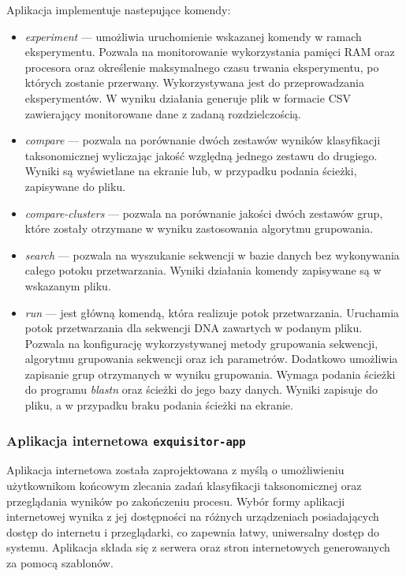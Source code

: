             Aplikacja implementuje nastepujące komendy:
            \begin{itemize}
                \item {
                    \textit{experiment} --- umożliwia uruchomienie wskazanej komendy w ramach eksperymentu. Pozwala na monitorowanie wykorzystania pamięci RAM oraz procesora oraz określenie maksymalnego czasu trwania eksperymentu, po których zostanie przerwany. Wykorzystywana jest do przeprowadzania eksperymentów. W wyniku działania generuje plik w formacie CSV zawierający monitorowane dane z zadaną rozdzielczością.
                }
                \item {
                    \textit{compare} --- pozwala na porównanie dwóch zestawów wyników klasyfikacji taksonomicznej wyliczając jakość względną jednego zestawu do drugiego. Wyniki są wyświetlane na ekranie lub, w przypadku podania ścieżki, zapisywane do pliku.
                }
                \item {
                    \textit{compare-clusters} --- pozwala na porównanie jakości dwóch zestawów grup, które zostały otrzymane w wyniku zastosowania algorytmu grupowania.
                }
                \item {
                    \textit{search} --- pozwala na wyszukanie sekwencji w bazie danych bez wykonywania całego potoku przetwarzania. Wyniki działania komendy zapisywane są w wskazanym pliku.
                }
                \item {
                    \textit{run} --- jest główną komendą, która realizuje potok przetwarzania. Uruchamia potok przetwarzania dla sekwencji DNA zawartych w podanym pliku. Pozwala na konfigurację wykorzystywanej metody grupowania sekwencji, algorytmu grupowania sekwencji oraz ich parametrów. Dodatkowo umożliwia zapisanie grup otrzymanych w wyniku grupowania. Wymaga podania ścieżki do programu \textit{blastn} oraz ścieżki do jego bazy danych. Wyniki zapisuje do pliku, a w przypadku braku podania ścieżki na ekranie.
                }
            \end{itemize}

        \subsubsection{Aplikacja internetowa \texttt{exquisitor-app}}
            Aplikacja internetowa została zaprojektowana z myślą o umożliwieniu użytkownikom końcowym zlecania zadań klasyfikacji taksonomicznej oraz przeglądania wyników po zakończeniu procesu. Wybór formy aplikacji internetowej wynika z jej dostępności na różnych urządzeniach posiadających dostęp do internetu i przeglądarki, co zapewnia łatwy, uniwersalny dostęp do systemu. Aplikacja składa się z serwera oraz stron internetowych generowanych za pomocą szablonów.

